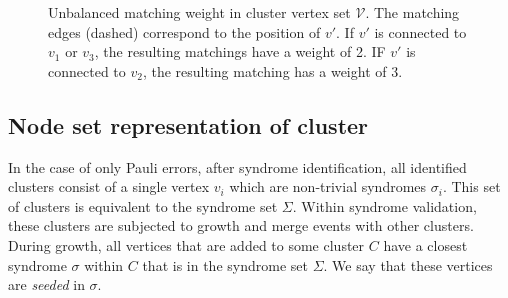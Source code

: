 \begin{figure}[h]
  \centering
  \vspace{1em}
  \caption{Unbalanced matching weight in cluster vertex set $\mathcal{V}$. The matching edges (dashed) correspond to the position of $v'$. If $v'$ is connected to $v_1$ or $v_3$, the resulting matchings have a weight of 2. IF $v'$ is connected to $v_2$, the resulting matching has a weight of 3.}\label{fig:PMW}
\end{figure}

\subsection{Node set representation of cluster}\label{sec:nodeset}

In the case of only Pauli errors, after syndrome identification, all identified clusters consist of a single vertex $v_i$ which are non-trivial syndromes $\sigma_i$. This set of clusters is equivalent to the syndrome set $\Sigma$. Within syndrome validation, these clusters are subjected to growth and merge events with other clusters. During growth, all vertices that are added to some cluster $C$ have a closest syndrome $\sigma$ within $C$ that is in the syndrome set $\Sigma$. We say that these vertices are \emph{seeded} in $\sigma$.


